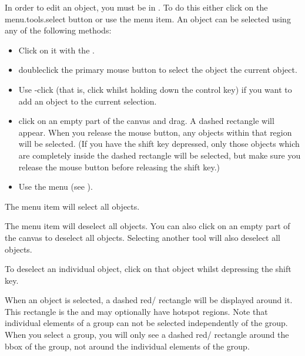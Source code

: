 In order to edit an \gls{object}, you must be in \selectmode. To do
this either click on the \gls{menu.tools.select} button or use the 
 menu item. An \gls*{object} can
be selected using any of the following methods:
\begin{itemize}
\item Click on it with the .

\item \Gls{doubleclick} the primary mouse button to
select the \gls*{object}  the current \gls*{object}.

\item Use -click (that is, \gls{click} whilst holding down the control
 key) if you want to add an \gls*{object} to the current
selection.

\item \Gls{click} on an empty part of the \gls{canvas} and
drag. A dashed rectangle will appear. When you release the mouse
button, any \glspl*{object} within that
region will be selected. (If you have the shift  key depressed,
only those objects which are completely inside the dashed
rectangle will be selected, but make sure you release the mouse
button before releasing the shift key.)

\item Use the  menu (see ).

\end{itemize}


The  menu item will select all
\glspl{object}.


The  menu item will deselect all
\glspl{object}. You can also click on
an empty part of the \gls{canvas} to deselect all \glspl{object}.
Selecting another tool will also deselect all \glspl*{object}.

\begin{information}
To deselect an individual \gls*{object}, click on that object whilst
depressing the shift  key.
\end{information}

When an \gls{object} is selected, a dashed red\slash{}
rectangle will be displayed around it. This rectangle is the 
\emph{} and may optionally have
\gls{hotspot} regions. Note that individual elements of a
\gls{group} can not be selected independently of the group.  When
you select a group, you will only see a dashed
red\slash{} rectangle around the \gls{bbox} of the group,
not around the individual elements of the group.

